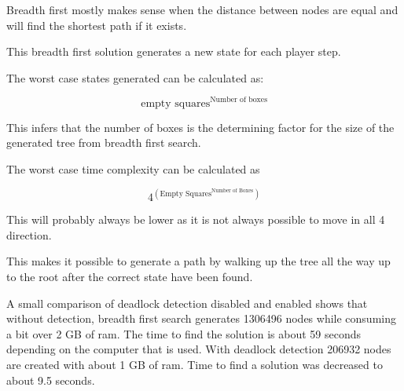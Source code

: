 \documentclass[../../main.tex]{subfiles}
\begin{document}
Breadth first mostly makes sense when the distance between nodes are equal and
will find the shortest path if it exists.

This breadth first solution generates a new state for each player step.

The worst case states generated can be calculated as:

\begin{equation}
	\textrm{empty squares}^{ \textrm{Number of boxes}}
\end{equation}

This infers that the number of boxes is the determining factor for the size
of the generated tree from breadth first search.

The worst case time complexity can be calculated as

\begin{equation}
	4^{  \left(  \textrm{Empty Squares} ^{ \textrm{Number of Boxes}}  \right)   }
\end{equation}

This will probably always be lower as it is not always possible to move in all 4 direction.

This makes it possible to generate a path by walking up the tree all the way up to the root after the correct state have 	been found.

A small comparison of deadlock detection disabled and enabled shows that without detection, breadth first search generates 1306496 nodes while consuming a bit over 2 GB of ram. The time to find the solution is about 59 seconds depending on the computer that is used.
With deadlock detection 206932 nodes are created with about 1 GB of ram. Time to find a solution was decreased to about 9.5 seconds.
\end{document}
